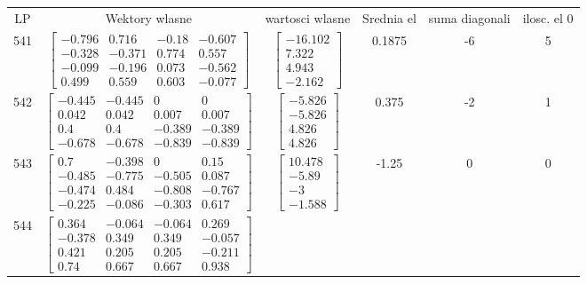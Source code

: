 \documentclass[a4paper,12pt]{article}
\begin{document}
\bgroup {} \vspace{0.2in} \begin{tabular}{c c c c c c}
LP &Wektory wlasne & wartosci wlasne & Srednia el & suma diagonali & ilosc. el 0\\
541
&
$\begin{bmatrix} -0.796 & 0.716 & -0.18 & -0.607 \\ -0.328 & -0.371 & 0.774 & 0.557 \\ -0.099 & -0.196 & 0.073 & -0.562 \\ 0.499 & 0.559 & 0.603 & -0.077 \end{bmatrix}$
&
$\begin{bmatrix} -16.102 \\ 7.322 \\ 4.943 \\ -2.162 \end{bmatrix}$
&
0.1875
&
-6
&
5
\\
542
&
$\begin{bmatrix} -0.445 & -0.445 & 0 & 0 \\ 0.042 & 0.042 & 0.007 & 0.007 \\ 0.4 & 0.4 & -0.389 & -0.389 \\ -0.678 & -0.678 & -0.839 & -0.839 \end{bmatrix}$
&
$\begin{bmatrix} -5.826 \\ -5.826 \\ 4.826 \\ 4.826 \end{bmatrix}$
&
0.375
&
-2
&
1
\\
543
&
$\begin{bmatrix} 0.7 & -0.398 & 0 & 0.15 \\ -0.485 & -0.775 & -0.505 & 0.087 \\ -0.474 & 0.484 & -0.808 & -0.767 \\ -0.225 & -0.086 & -0.303 & 0.617 \end{bmatrix}$
&
$\begin{bmatrix} 10.478 \\ -5.89 \\ -3 \\ -1.588 \end{bmatrix}$
&
-1.25
&
0
&
0
\\
544
&
$\begin{bmatrix} 0.364 & -0.064 & -0.064 & 0.269 \\ -0.378 & 0.349 & 0.349 & -0.057 \\ 0.421 & 0.205 & 0.205 & -0.211 \\ 0.74 & 0.667 & 0.667 & 0.938 \end{bmatrix}$

\end{tabular}
\end{document}

